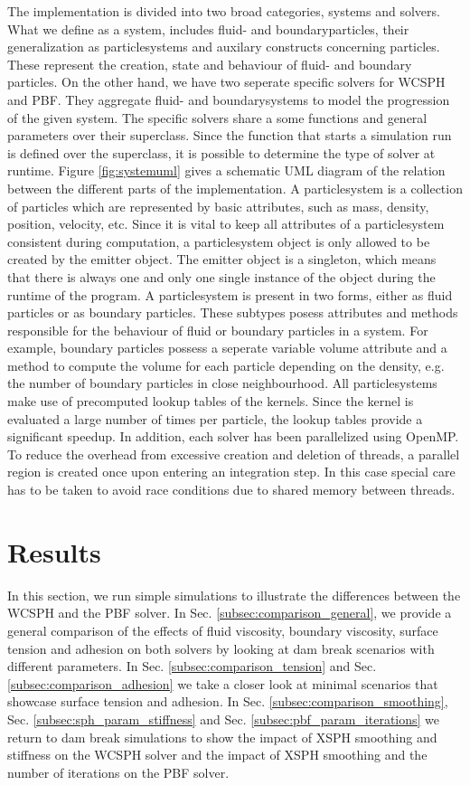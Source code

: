 \documentclass[11pt, letterpaper, twocolumn]{article}
\begin{document}
The implementation is divided into two broad categories, systems and solvers.
What we define as a system, includes fluid- and boundaryparticles, their generalization as particlesystems and auxilary constructs concerning particles. These represent the creation, state and behaviour of fluid- and boundary particles.
On the other hand, we have two seperate specific solvers for WCSPH and PBF. They aggregate fluid- and boundarysystems to model the progression of the given system. The specific solvers share a some functions and general parameters over their superclass. Since the function that starts a simulation run is defined over the superclass, it is possible to determine the type of solver at runtime.
Figure \ref{fig:systemuml} gives a schematic UML diagram of the relation between the different parts of the implementation.
A particlesystem is a collection of particles which are represented by basic attributes, such as mass, density, position, velocity, etc. Since it is vital to keep all attributes of a particlesystem consistent during computation, a particlesystem object is only allowed to be created by the emitter object. The emitter object is a singleton, which means that there is always one and only one single instance of the object during the runtime of the program. A particlesystem is present in two forms, either as fluid particles or as boundary particles. These subtypes posess attributes and methods responsible for the behaviour of fluid or boundary particles in a system. For example, boundary particles possess a seperate variable volume attribute and a method to compute the volume for each particle depending on the density, e.g. the number of boundary particles in close neighbourhood. All particlesystems make use of precomputed lookup tables of the kernels. Since the kernel is evaluated a large number of times per particle, the lookup tables provide a significant speedup.
In addition, each solver has been parallelized using OpenMP. To reduce the overhead from excessive creation and deletion of threads, a parallel region is created once upon entering an integration step. In this case special care has to be taken to avoid race conditions due to shared memory between threads. 

\section{Results}
\label{sec:results}
In this section, we run simple simulations to illustrate the differences between the WCSPH and the PBF solver. In Sec. \ref{subsec:comparison_general}, we provide a general comparison of the effects of fluid viscosity, boundary viscosity, surface tension and adhesion on both solvers by looking at dam break scenarios with different parameters. In Sec. \ref{subsec:comparison_tension} and Sec. \ref{subsec:comparison_adhesion} we take a closer look at minimal scenarios that showcase surface tension and 
adhesion. In Sec. \ref{subsec:comparison_smoothing}, Sec. \ref{subsec:sph_param_stiffness} and Sec. \ref{subsec:pbf_param_iterations} we return to dam break simulations to show the impact of XSPH smoothing and stiffness on the WCSPH solver and the impact of XSPH smoothing and the number of iterations on the PBF solver.  
\end{document}
